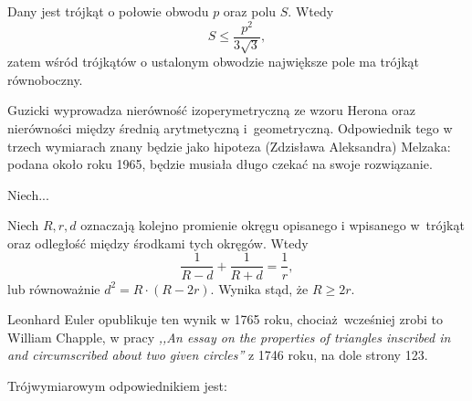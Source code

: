 
\begin{proposition}
	Dany jest trójkąt o połowie obwodu $p$ oraz polu $S$.
	Wtedy 
	\begin{equation}
		S \le \frac{p^2}{3 \sqrt 3},
	\end{equation}
	zatem wśród trójkątów o ustalonym obwodzie największe pole ma trójkąt równoboczny.
\end{proposition}

Guzicki \cite[s. 169, 170]{guzicki_2021} wyprowadza nierówność izoperymetryczną ze wzoru Herona oraz nierówności między średnią arytmetyczną i~geometryczną.
%
Odpowiednik tego w trzech wymiarach znany będzie jako hipoteza (Zdzisława Aleksandra) Melzaka: podana około roku 1965, będzie musiała długo czekać na swoje rozwiązanie.
%

\begin{proposition}
	Niech... %
\end{proposition}

\begin{proposition}
%
	Niech $R, r, d$ oznaczają kolejno promienie okręgu opisanego i wpisanego w~trójkąt oraz odległość między środkami tych okręgów.
	Wtedy
	\begin{equation}
	\frac{1}{R-d} + \frac{1}{R+d} = \frac 1 r,
	\end{equation}
	lub równoważnie $d^2 = R \cdot (R - 2r)$.
	Wynika stąd, że $R \ge 2r$.
\end{proposition}

Leonhard Euler opublikuje ten wynik w 1765 roku, chociaż wcześniej zrobi to William Chapple, w pracy \emph{,,An essay on the properties of triangles inscribed in and circumscribed about two given circles''} z 1746 roku, na dole strony 123.

Trójwymiarowym odpowiednikiem jest:

